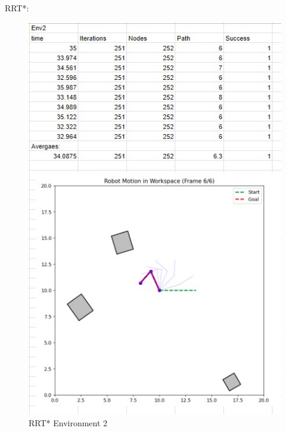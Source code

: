 \documentclass{article}
\begin{document}
    RRT*: 
    \begin{figure} [H]
        \centering
        \includegraphics[width=0.5\linewidth]{latex_media/RRTStarEnv2Stats.jpg}
        \caption{RRT* Environment 2}
    \end{figure}
\end{document}
